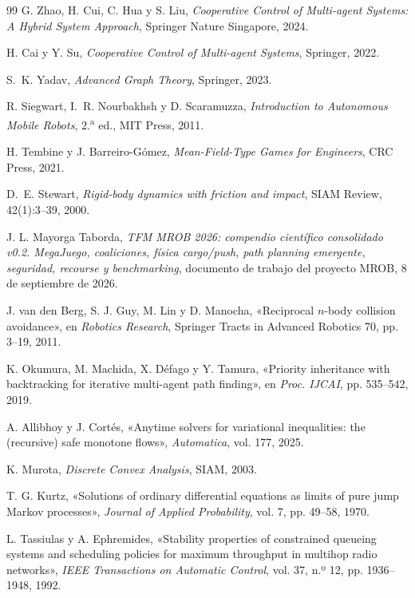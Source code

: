 \documentclass[11pt,a4paper]{article}
\theoremstyle{plain}
\theoremstyle{definition}
\theoremstyle{remark}
\begin{document}
\begin{thebibliography}{99}
G. Zhao, H. Cui, C. Hua y S. Liu,
\emph{Cooperative Control of Multi-agent Systems: A Hybrid System Approach},
Springer Nature Singapore, 2024.

H. Cai y Y. Su,
\emph{Cooperative Control of Multi-agent Systems},
Springer, 2022.

S.~K. Yadav,
\emph{Advanced Graph Theory},
Springer, 2023.

R. Siegwart, I.~R. Nourbakhsh y D. Scaramuzza,
\emph{Introduction to Autonomous Mobile Robots}, 2.\textsuperscript{a} ed.,
MIT Press, 2011.

H. Tembine y J. Barreiro-Gómez,
\emph{Mean-Field-Type Games for Engineers},
CRC Press, 2021.

D.~E. Stewart,
\emph{Rigid-body dynamics with friction and impact},
SIAM Review, 42(1):3--39, 2000.

J. L. Mayorga Taborda,
\emph{TFM MROB 2026: compendio científico consolidado v0.2. MegaJuego, coaliciones, física cargo/push, path planning emergente, seguridad, recourse y benchmarking},
documento de trabajo del proyecto MROB, 8 de septiembre de 2026.

J. van den Berg, S. J. Guy, M. Lin y D. Manocha,
«Reciprocal $n$-body collision avoidance»,
en \emph{Robotics Research}, Springer Tracts in Advanced Robotics 70, pp. 3--19, 2011.

K. Okumura, M. Machida, X. Défago y Y. Tamura,
«Priority inheritance with backtracking for iterative multi-agent path finding»,
en \emph{Proc. IJCAI}, pp. 535--542, 2019.

A. Allibhoy y J. Cortés,
«Anytime solvers for variational inequalities: the (recursive) safe monotone flows»,
\emph{Automatica}, vol. 177, 2025.

K. Murota,
\emph{Discrete Convex Analysis},
SIAM, 2003.

T. G. Kurtz,
«Solutions of ordinary differential equations as limits of pure jump Markov processes»,
\emph{Journal of Applied Probability}, vol. 7, pp. 49--58, 1970.

L. Tassiulas y A. Ephremides,
«Stability properties of constrained queueing systems and scheduling policies for maximum throughput in multihop radio networks»,
\emph{IEEE Transactions on Automatic Control}, vol. 37, n.º 12, pp. 1936--1948, 1992.


\end{thebibliography}
\end{document}
